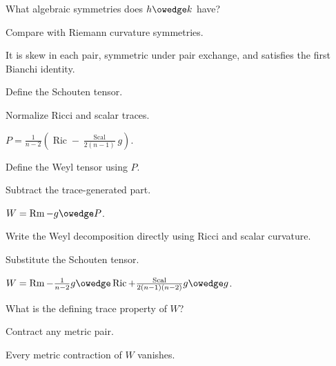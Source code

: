 \begin{exercise}\label{exr:vii28-02}
What algebraic symmetries does \(h\owedge k\) have?
\end{exercise}
\begin{hint}
Compare with Riemann curvature symmetries.
\end{hint}
\begin{solution}
It is skew in each pair, symmetric under pair exchange, and satisfies the first Bianchi identity.
\end{solution}

\begin{exercise}\label{exr:vii28-03}
Define the Schouten tensor.
\end{exercise}
\begin{hint}
Normalize Ricci and scalar traces.
\end{hint}
\begin{solution}
\(P=\frac1{n-2}(\operatorname{Ric}-\frac{\operatorname{Scal}}{2(n-1)}g)\).
\end{solution}

\begin{exercise}\label{exr:vii28-04}
Define the Weyl tensor using \(P\).
\end{exercise}
\begin{hint}
Subtract the trace-generated part.
\end{hint}
\begin{solution}
\(W=\operatorname{Rm}-g\owedge P\).
\end{solution}

\begin{exercise}\label{exr:vii28-05}
Write the Weyl decomposition directly using Ricci and scalar curvature.
\end{exercise}
\begin{hint}
Substitute the Schouten tensor.
\end{hint}
\begin{solution}
\(W=\operatorname{Rm}-\frac1{n-2}g\owedge\operatorname{Ric}+\frac{\operatorname{Scal}}{2(n-1)(n-2)}g\owedge g\).
\end{solution}

\begin{exercise}\label{exr:vii28-06}
What is the defining trace property of \(W\)?
\end{exercise}
\begin{hint}
Contract any metric pair.
\end{hint}
\begin{solution}
Every metric contraction of \(W\) vanishes.
\end{solution}

